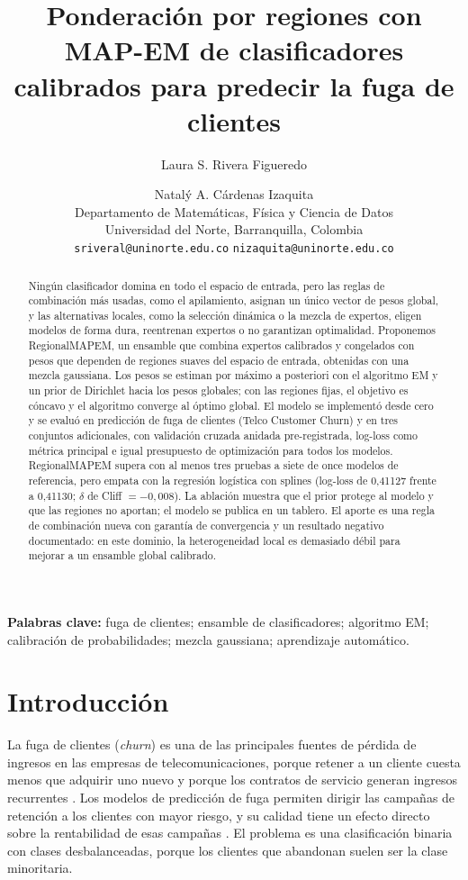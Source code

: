 \documentclass[11pt,a4paper]{article}
\title{Ponderación por regiones con MAP-EM de clasificadores calibrados para predecir la fuga de clientes}
\author{Laura S. Rivera Figueredo \and Natalý A. Cárdenas Izaquita\\[2pt]
\small Departamento de Matemáticas, Física y Ciencia de Datos\\
\small Universidad del Norte, Barranquilla, Colombia\\
\small \texttt{sriveral@uninorte.edu.co} \quad \texttt{nizaquita@uninorte.edu.co}}
\date{}
\begin{document}
\maketitle

\begin{abstract}
\noindent Ningún clasificador domina en todo el espacio de entrada, pero las reglas de combinación más usadas, como el apilamiento, asignan un único vector de pesos global, y las alternativas locales, como la selección dinámica o la mezcla de expertos, eligen modelos de forma dura, reentrenan expertos o no garantizan optimalidad. Proponemos RegionalMAPEM, un ensamble que combina expertos calibrados y congelados con pesos que dependen de regiones suaves del espacio de entrada, obtenidas con una mezcla gaussiana. Los pesos se estiman por máximo a posteriori con el algoritmo EM y un prior de Dirichlet hacia los pesos globales; con las regiones fijas, el objetivo es cóncavo y el algoritmo converge al óptimo global. El modelo se implementó desde cero y se evaluó en predicción de fuga de clientes (Telco Customer Churn) y en tres conjuntos adicionales, con validación cruzada anidada pre-registrada, log-loss como métrica principal e igual presupuesto de optimización para todos los modelos. RegionalMAPEM supera con al menos tres pruebas a siete de once modelos de referencia, pero empata con la regresión logística con splines (log-loss de 0,41127 frente a 0,41130; $\delta$ de Cliff $=-0{,}008$). La ablación muestra que el prior protege al modelo y que las regiones no aportan; el modelo se publica en un tablero. El aporte es una regla de combinación nueva con garantía de convergencia y un resultado negativo documentado: en este dominio, la heterogeneidad local es demasiado débil para mejorar a un ensamble global calibrado.
\end{abstract}

\noindent\textbf{Palabras clave:} fuga de clientes; ensamble de clasificadores; algoritmo EM; calibración de probabilidades; mezcla gaussiana; aprendizaje automático.

\section{Introducción}\label{sec:intro}

La fuga de clientes (\emph{churn}) es una de las principales fuentes de pérdida de ingresos en las empresas de telecomunicaciones, porque retener a un cliente cuesta menos que adquirir uno nuevo y porque los contratos de servicio generan ingresos recurrentes \cite{verbeke2012,neslin2006}. Los modelos de predicción de fuga permiten dirigir las campañas de retención a los clientes con mayor riesgo, y su calidad tiene un efecto directo sobre la rentabilidad de esas campañas \cite{neslin2006,verbeke2012}. El problema es una clasificación binaria con clases desbalanceadas, porque los clientes que abandonan suelen ser la clase minoritaria.
\end{document}

